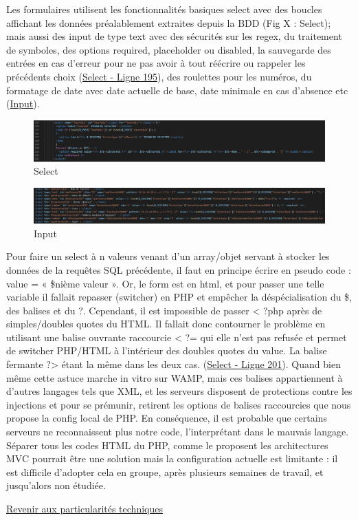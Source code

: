 \documentclass[12pt]{report}
\begin{document}
\bigskip
\par
Les formulaires utilisent les fonctionnalités basiques select avec des boucles affichant les données préalablement extraites depuis la BDD (Fig X : Select); mais aussi des input de type text avec des sécurités sur les regex, du traitement de symboles, des options required, placeholder ou disabled, la sauvegarde des entrées en cas d’erreur pour ne pas avoir à tout réécrire ou rappeler les précédents choix (\hyperlink{fig-select}{Select - Ligne 195}), des roulettes pour les numéros, du formatage de date avec date actuelle de base, date minimale en cas d’absence etc (\hyperlink{fig-input}{Input}).
\begin{figure}[h]
\hypertarget{fig-select}{}
			\centering
				\includegraphics[width= 17cm]{figures/pt-select.png}
			\caption{Select}
\end{figure}

\begin{figure}[h]
\hypertarget{fig-input}{}
			\centering
				\includegraphics[width= 17cm]{figures/pt-input.png}
			\caption{Input}
\end{figure}
\bigskip
\par
Pour faire un select à n valeurs venant d’un array/objet servant à stocker les données de la requêtes SQL précédente, il faut en principe écrire en pseudo code : value = « \$nième valeur ». Or, le form est en html, et pour passer une telle variable il fallait repasser (switcher) en PHP et empêcher la déspécialisation du \$, des balises et du ?. Cependant, il est impossible de passer < ?php après de simples/doubles quotes du HTML. Il fallait donc contourner le problème en utilisant une balise ouvrante raccourcie < ?= qui elle n’est pas refusée et permet de switcher PHP/HTML à l’intérieur des doubles quotes du value. La balise fermante ?> étant la même dans les deux cas. (\hyperlink{fig-select}{Select - Ligne 201}). Quand bien même cette astuce marche in vitro sur WAMP, mais ces balises appartiennent à d’autres langages tels que XML, et les serveurs disposent de protections contre les injections et pour se prémunir, retirent les options de balises raccourcies que nous propose la config local de PHP. En conséquence, il est probable que certains serveurs ne reconnaissent plus notre code, l’interprétant dans le mauvais langage. Séparer tous les codes HTML du PHP, comme le proposent les architectures MVC pourrait être une solution mais la configuration actuelle est limitante : il est difficile d’adopter cela en groupe, après plusieurs semaines de travail, et jusqu’alors non étudiée.
\bigskip
\par
\hyperlink{retour-formulaires}{Revenir aux particularités techniques}
\newpage
\end{document}
